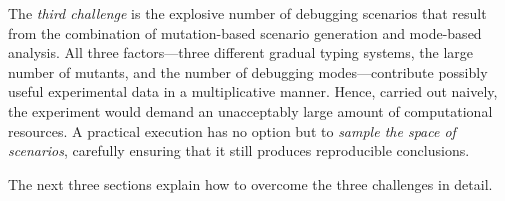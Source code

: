 The {\em third challenge\/} is the explosive number of debugging scenarios that
result from the combination of mutation-based scenario generation and mode-based
analysis. All three factors---three different gradual typing systems, the large
number of mutants, and the number of debugging modes---contribute possibly
useful experimental data in a multiplicative manner. Hence, carried out naively,
the experiment would demand an unacceptably large amount of computational
resources.  A practical execution has no option but to {\em sample the space of
scenarios\/}, carefully ensuring that it still produces reproducible
conclusions.

The next three sections explain how to overcome the three challenges
in detail. 



    



